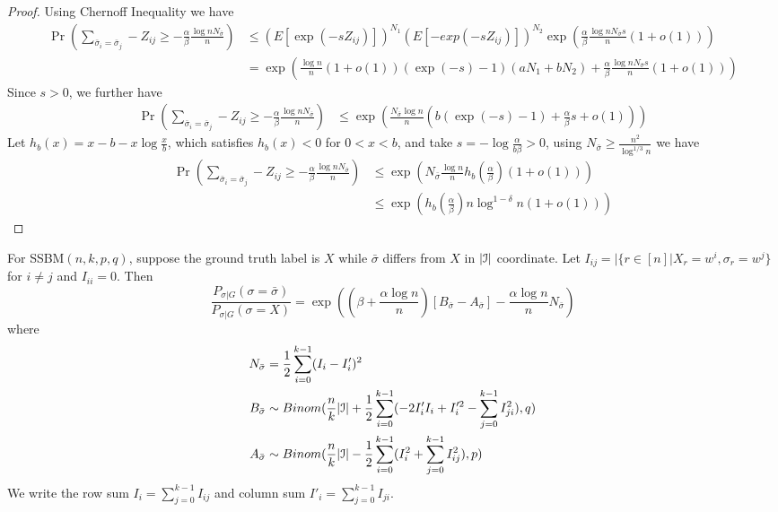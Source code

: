 \documentclass{article}
\begin{document}
\begin{proof}
	Using Chernoff Inequality we have
	\begin{align*}
	\Pr(\sum_{ \bar{\sigma}_i  = \bar{\sigma}_j } -Z_{ij} \geq -\frac{\alpha}{\beta}\frac{\log n N_{\bar{\sigma}}}{n})& \leq (E[\exp(-s Z_{ij})])^{N_1} (E[-exp(-s Z_{ij})])^{N_2} \exp(\frac{\alpha}{\beta} \frac{\log n N_{\bar{\sigma}} s}{n}(1+o(1))) \\
	&= \exp( \frac{\log n}{n}(1+o(1))(\exp(-s)-1)(aN_1 + bN_2)+\frac{\alpha}{\beta} \frac{\log n N_{\bar{\sigma}} s}{n}(1+o(1)))
	\end{align*}
	Since $s > 0$, we further have
	\begin{align*}
	\Pr(\sum_{ \bar{\sigma}_i  = \bar{\sigma}_j } -Z_{ij} \geq -\frac{\alpha}{\beta}\frac{\log n N_{\bar{\sigma}}}{n})
	& \leq \exp( \frac{N_{\bar{\sigma}}\log n }{n}(b(\exp(-s)-1)+ \frac{\alpha}{\beta}s + o(1))) 
	\end{align*}
	Let $h_b(x) = x - b -x\log \frac{x}{b}$, which satisfies $h_b(x) < 0$ for $0<x<b$,
	and take $s=-\log\frac{\alpha}{b\beta} > 0$, using 
	$N_{\bar{\sigma}} \geq \frac{n^2}{\log^{1/3} n}$ we have
	\begin{align*}
	\Pr(\sum_{ \bar{\sigma}_i  = \bar{\sigma}_j } -Z_{ij} \geq -\frac{\alpha}{\beta}\frac{\log n N_{\bar{\sigma}}}{n})&\leq \exp( N_{\bar{\sigma}} \frac{\log n}{n} h_b(\frac{\alpha}{\beta})(1+o(1))) \\
	& \leq \exp (h_b(\frac{\alpha}{\beta}) n \log^{1-\delta} n (1+o(1)))
	\end{align*}
\end{proof}
\begin{lemma}\label{lem:minus}
	For SSBM$(n,k,p,q)$, suppose the ground truth label is $X$ while $\bar{\sigma}$ differs from $X$ in $|\mathcal{I}|$ coordinate.
	Let $I_{ij} = |\{r\in [n] | X_r = w^i, \sigma_r = w^j \}$ for $i\neq j$ and $I_{ii} = 0$.
	Then
	\begin{equation}\label{eq:general_expansion}
\frac{P_{\sigma|G}(\sigma=\bar{\sigma})}{P_{\sigma|G}(\sigma=X)} = \exp((\beta + \frac{\alpha \log n}{n})[B_{\bar{\sigma}} - A_{\bar{\sigma}}] - \frac{\alpha \log n}{n} N_{\bar{\sigma}})
\end{equation}
	where 
	\begin{align}
	N_{\bar{\sigma}} &= \frac{1}{2}\sum_{i=0}^{k-1} (I_i - I_i')^2 \label{eq:N_w} \\
	B_{\bar{\sigma}} & \sim Binom(\frac{n}{k}|\mathcal{I}| + \frac{1}{2}\sum_{i=0}^{k-1}  (-2 I'_i I_i  + I'^2_i - \sum_{j=0}^{k-1} I^2_{ji}) , q)\\
	A_{\bar{\sigma}} & \sim Binom(\frac{n}{k}|\mathcal{I}| - \frac{1}{2}\sum_{i=0}^{k-1}  (I^2_i + \sum_{j=0}^{k-1} I^2_{ij}), p) \label{eq:A_w}
	\end{align}
	We write the row sum $I_i = \sum_{j=0}^{k-1} I_{ij}$ and column sum $I'_i = \sum_{j=0}^{k-1} I_{ji}$.
\end{lemma}
\end{document}
